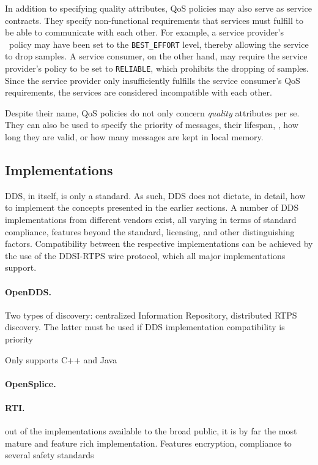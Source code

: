 In addition to specifying quality attributes, QoS policies may also serve as service contracts. They specify non-functional requirements that services must fulfill to be able to communicate with each other. For example, a service provider's \reliability\ policy may have been set to the \texttt{BEST\_EFFORT} level, thereby allowing the service to drop samples. A service consumer, on the other hand, may require the service provider's policy to be set to \texttt{RELIABLE}, which prohibits the dropping of samples. Since the service provider only insufficiently fulfills the service consumer's QoS requirements, the services are considered incompatible with each other.

Despite their name, QoS policies do not only concern \emph{quality} attributes per se. They can also be used to specify the priority of messages, their lifespan, \ie , how long they are valid, or how many messages are kept in local memory.

\subsection{Implementations}
DDS, in itself, is only a standard. As such, DDS does not dictate, in detail, how to implement the concepts presented in the earlier sections. A number of DDS implementations from different vendors exist, all varying in terms of standard compliance, features beyond the standard, licensing, and other distinguishing factors. Compatibility between the respective implementations can be achieved by the use of the DDSI-RTPS wire protocol, which all major implementations support.

\paragraph{OpenDDS.}
Two types of discovery: centralized Information Repository, distributed RTPS discovery. The latter must be used if DDS implementation compatibility is priority

Only supports C++ and Java

\paragraph{OpenSplice.}


\paragraph{RTI.}
out of the implementations available to the broad public, it is by far the most mature and feature rich implementation.
Features encryption, compliance to several safety standards

%
%
%
%
%
%
%
%
%
%
%
%
%
%
%
%
%
%
%
%